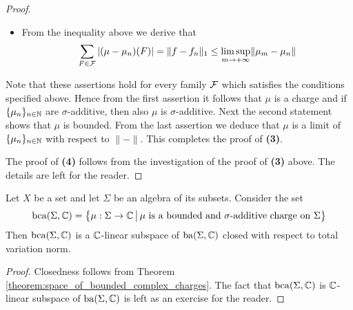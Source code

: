 \begin{proof}
\begin{itemize}
        \item From the inequality above we derive that
              $$\sum_{F\in {\mathcal F}}|(\mu - \mu_n)(F)| = \lVert f - f_n\rVert_1 \leq \limsup_{m\rightarrow +\infty}\lVert \mu_m - \mu_n\rVert$$
    \end{itemize}
    Note that these assertions hold for every family ${\mathcal F}$ which satisfies the conditions specified above. Hence from the first assertion it follows that $\mu$ is a charge and if $\{\mu_n\}_{n\in {\mathbb N}}$ are $\sigma$-additive, then also $\mu$ is $\sigma$-additive. Next the second statement shows that $\mu$ is bounded. From the last assertion we deduce that $\mu$ is a limit of $\{\mu_n\}_{n\in {\mathbb N}}$ with respect to $\lVert-\rVert$. This completes the proof of \textbf{(3)}.

    The proof of \textbf{(4)} follows from the investigation of the proof of \textbf{(3)} above. The details are left for the reader.
\end{proof}

\begin{corollary}\label{corollary:spaces_of_sigma_additive_charges}
    Let $X$ be a set and let $\Sigma$ be an algebra of its subsets. Consider the set
    $$\mathrm{bca}(\Sigma, {\mathbb C}) = \big\{\mu:\Sigma \rightarrow {\mathbb C}\,\big|\,\mu\mbox{ is a bounded and $\sigma$-additive charge on }\Sigma\big\}$$
    Then $\mathrm{bca}(\Sigma,{\mathbb C})$ is a ${\mathbb C}$-linear subspace of $\mathrm{ba}(\Sigma,{\mathbb C})$ closed with respect to total variation norm.
\end{corollary}
\begin{proof}
    Closedness follows from Theorem \ref{theorem:space_of_bounded_complex_charges}. The fact that $\mathrm{bca}(\Sigma, {\mathbb C})$ is ${\mathbb C}$-linear subspace of $\mathrm{ba}(\Sigma,{\mathbb C})$ is left as an exercise for the reader.
\end{proof}

